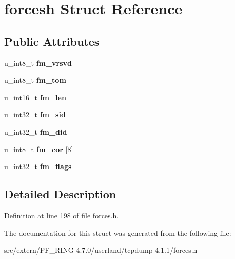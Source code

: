 \hypertarget{structforcesh}{
\section{forcesh Struct Reference}
\label{structforcesh}
}
\subsection*{Public Attributes}
\begin{DoxyCompactItemize}
\item 
\hypertarget{structforcesh_ac846058ba3d1960486af248d5d6c5489}{
u\_\-int8\_\-t {\bfseries fm\_\-vrsvd}}
\label{structforcesh_ac846058ba3d1960486af248d5d6c5489}

\item 
\hypertarget{structforcesh_a1254d2eb4075405f33b9516e9c760912}{
u\_\-int8\_\-t {\bfseries fm\_\-tom}}
\label{structforcesh_a1254d2eb4075405f33b9516e9c760912}

\item 
\hypertarget{structforcesh_aa41c50a2f8ef09f3992fdb39acd60b94}{
u\_\-int16\_\-t {\bfseries fm\_\-len}}
\label{structforcesh_aa41c50a2f8ef09f3992fdb39acd60b94}

\item 
\hypertarget{structforcesh_a774aa610520d4de6c5c61b0a8539b362}{
u\_\-int32\_\-t {\bfseries fm\_\-sid}}
\label{structforcesh_a774aa610520d4de6c5c61b0a8539b362}

\item 
\hypertarget{structforcesh_a325c113bd8b44ef1d121872a2474ce54}{
u\_\-int32\_\-t {\bfseries fm\_\-did}}
\label{structforcesh_a325c113bd8b44ef1d121872a2474ce54}

\item 
\hypertarget{structforcesh_a2e356e3f873c33ac4eaa0dba277a4537}{
u\_\-int8\_\-t {\bfseries fm\_\-cor} \mbox{[}8\mbox{]}}
\label{structforcesh_a2e356e3f873c33ac4eaa0dba277a4537}

\item 
\hypertarget{structforcesh_a3b413b417b3f41a397ffdea15199ff28}{
u\_\-int32\_\-t {\bfseries fm\_\-flags}}
\label{structforcesh_a3b413b417b3f41a397ffdea15199ff28}

\end{DoxyCompactItemize}


\subsection{Detailed Description}


Definition at line 198 of file forces.h.



The documentation for this struct was generated from the following file:\begin{DoxyCompactItemize}
\item 
src/extern/PF\_\-RING-\/4.7.0/userland/tcpdump-\/4.1.1/forces.h\end{DoxyCompactItemize}
